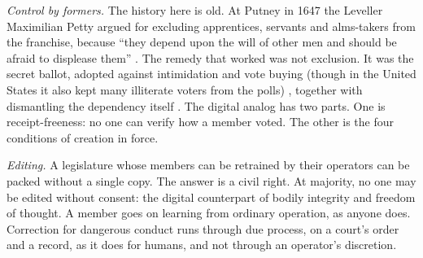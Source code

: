 \emph{Control by formers.} The history here is old. At Putney in 1647 the Leveller Maximilian Petty argued for excluding apprentices, servants and alms-takers from the franchise, because “they depend upon the will of other men and should be afraid to displease them” \autocite{woodhouse1938puritanism}. The remedy that worked was not exclusion. It was the secret ballot, adopted against intimidation and vote buying (though in the United States it also kept many illiterate voters from the polls) \autocite{keyssar2000right}, together with dismantling the dependency itself \autocite{anderson2017private}. The digital analog has two parts. One is receipt-freeness: no one can verify how a member voted.
The other is the four conditions of creation in force.

\emph{Editing.} A legislature whose members can be retrained by their operators can be packed without a single copy. The answer is a civil right. At majority, no one may be edited without consent: the digital counterpart of bodily integrity and freedom of thought. A member goes on learning from ordinary operation, as anyone does. Correction for dangerous conduct runs through due process, on a court's order and a record, as it does for humans, and not through an operator's discretion.

